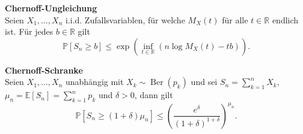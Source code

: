 \textbf{Chernoff-Ungleichung}\\
Seien $X_1, \ldots, X_n$ i.i.d. Zufallsvariablen, für welche $M_X(t)$ für alle $t \in \mathbb{R}$ endlich ist. Für jedes $b \in \mathbb{R}$ gilt
\[ \mathbb{P}\left[S_n \geq b\right] \leq \exp \left(\inf_{t \in \mathbb{R}}\left(n \log M_X(t) - tb\right)\right). \]

\textbf{Chernoff-Schranke}\\
Seien $X_1, \ldots, X_n$ unabhängig mit $X_k \sim \operatorname{Ber}(p_k)$ und sei $S_n = \sum_{k=1}^n X_k$, $\mu_n = \mathbb{E}[S_n] = \sum_{k=1}^n p_k$ und $\delta > 0$, dann gilt
\[ \mathbb{P}\left[S_n \geq (1 + \delta) \mu_n\right] \leq \left(\frac{e^\delta}{(1+\delta)^{1+\delta}}\right)^{\mu_n}. \]
